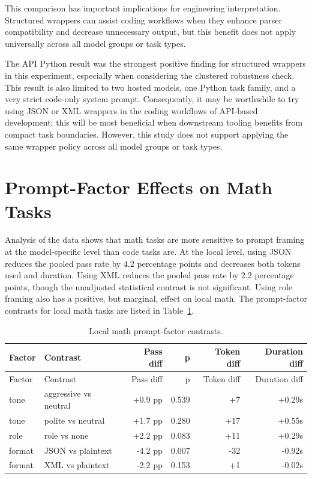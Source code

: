 This comparison has important implications for engineering interpretation. Structured wrappers can assist coding workflows when they enhance parser compatibility and decrease unnecessary output, but this benefit does not apply universally across all model groups or task types.

The API Python result was the strongest positive finding for structured wrappers in this experiment, especially when considering the clustered robustness check. This result is also limited to two hosted models, one Python task family, and a very strict code-only system prompt. Consequently, it may be worthwhile to try using JSON or XML wrappers in the coding workflows of API-based development; this will be most beneficial when downstream tooling benefits from compact task boundaries. However, this study does not support applying the same wrapper policy across all model groups or task types.

\section{Prompt-Factor Effects on Math Tasks\label{sec:math-task-effects}}

Analysis of the data shows that math tasks are more sensitive to prompt framing at the model-specific level than code tasks are. At the local level, using JSON reduces the pooled pass rate by 4.2 percentage points and decreases both tokens used and duration. Using XML reduces the pooled pass rate by 2.2 percentage points, though the unadjusted statistical contrast is not significant. Using role framing also has a positive, but marginal, effect on local math. The prompt-factor contrasts for local math tasks are listed in Table~\ref{tab:local-math-contrasts}.

\begin{longtable}[]{@{}llrrrr@{}}
\caption{Local math prompt-factor contrasts.}\label{tab:local-math-contrasts}\tabularnewline
\toprule\noalign{}
Factor & Contrast & Pass diff & p & Token diff & Duration diff \\
\midrule\noalign{}
\endfirsthead
\toprule\noalign{}
Factor & Contrast & Pass diff & p & Token diff & Duration diff \\
\midrule\noalign{}
\endhead
\bottomrule\noalign{}
\endlastfoot
tone & aggressive vs neutral & +0.9 pp & 0.539 & +7 & +0.29s \\
tone & polite vs neutral & +1.7 pp & 0.280 & +17 & +0.55s \\
role & role vs none & +2.2 pp & 0.083 & +11 & +0.29s \\
format & JSON vs plaintext & -4.2 pp & 0.007 & -32 & -0.92s \\
format & XML vs plaintext & -2.2 pp & 0.153 & +1 & -0.02s \\
\end{longtable}

